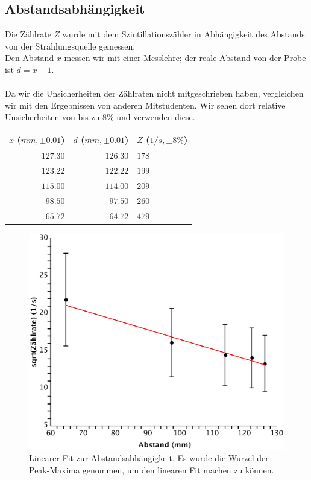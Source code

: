 \documentclass{article}
\begin{document}
\subsection{Abstandsabhängigkeit}
Die Zählrate $Z$ wurde mit dem Szintillationszähler in Abhängigkeit des Abstands von der Strahlungsquelle gemessen.\\
Den Abstand $x$ messen wir mit einer Messlehre; der reale Abstand von der Probe ist $d=x-1$.\\
\\
Da wir die Unsicherheiten der Zählraten nicht mitgeschrieben haben, vergleichen wir mit den Ergebnissen von anderen Mitstudenten. Wir sehen dort relative Unsicherheiten von bis zu $8\%$ und verwenden diese.
\\
\begin{tabular}{|r|r|l|}
\hline
$x$ ($\si{mm}, \pm 0.01$) & $d$ ($\si{mm}, \pm 0.01$) & $Z$ ($1/s, \pm 8\% $)\\
\hline
$127.30$ & $126.30$ & $178$\\
$123.22$ & $122.22$ & $199$\\
$115.00$ & $114.00$ & $209$\\
$98.50$ & $97.50$ & $260$\\
$65.72$ & $64.72$ & $479$\\
\hline
\end{tabular}

\begin{center}
\begin{figure}[H]
\includegraphics[scale=0.6]{abstandwurzel.eps}
\caption{Linearer Fit zur Abstandsabhängigkeit. Es wurde die Wurzel der Peak-Maxima genommen, um den linearen Fit machen zu können.}
\end{figure}
\end{center}
\end{document}
